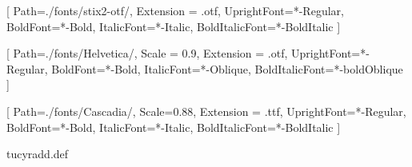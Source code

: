\usepackage{ifxetex}
\ifxetex
    \usepackage{xltxtra}

    \setmainfont{STIXTwoText}[
        Path=./fonts/stix2-otf/,
	Extension = .otf,
        UprightFont=*-Regular,
        BoldFont=*-Bold,
        ItalicFont=*-Italic,
        BoldItalicFont=*-BoldItalic
    ]


    
    

    \setsansfont{Helvetica}[
        Path=./fonts/Helvetica/,
        Scale = 0.9,
        Extension = .otf,
        UprightFont=*-Regular,
        BoldFont=*-Bold,
        ItalicFont=*-Oblique,
        BoldItalicFont=*-boldOblique
    ]
    
    \setmonofont{CascadiaCode}[
        Path=./fonts/Cascadia/,
        Scale=0.88,
        Extension = .ttf,
        UprightFont=*-Regular,
        BoldFont=*-Bold,
        ItalicFont=*-Italic,
        BoldItalicFont=*-BoldItalic
    ]

    
    {tucyradd.def}
\else
    \usepackage[utf8]{inputenc}
    \usepackage[T2A]{fontenc}
\fi

